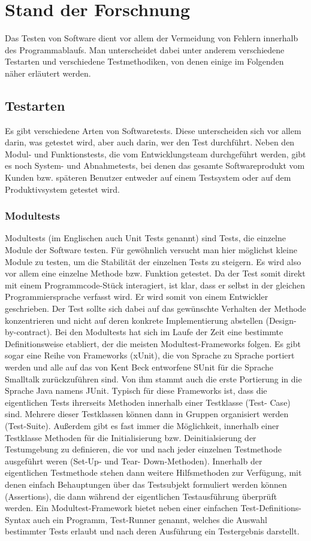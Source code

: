 \section{Stand der Forschnung}
Das Testen von Software dient vor allem der Vermeidung von Fehlern innerhalb des Programmablaufs. Man unterscheidet dabei unter anderem verschiedene Testarten und verschiedene Testmethodiken, von denen einige im Folgenden näher erläutert werden.

\subsection{Testarten}
Es gibt verschiedene Arten von Softwaretests. Diese unterscheiden sich vor allem darin, was getestet wird, aber auch darin, wer den Test durchführt. Neben den Modul- und Funktionstests, die vom Entwicklungsteam durchgeführt werden, gibt es noch System- und Abnahmetests, bei denen das gesamte Softwareprodukt vom Kunden bzw. späteren Benutzer entweder auf einem Testsystem oder auf dem Produktivsystem getestet wird.

\subsubsection{Modultests}
Modultests (im Englischen auch Unit Tests genannt) sind Tests, die einzelne Module der Software testen. Für gewöhnlich versucht man hier möglichst kleine Module zu testen, um die Stabilität der einzelnen Tests zu steigern. Es wird also vor allem eine einzelne Methode bzw. Funktion getestet. Da der Test somit direkt mit einem Programmcode-Stück interagiert, ist klar, dass er selbst in der gleichen Programmiersprache verfasst wird. Er wird somit von einem Entwickler geschrieben. Der Test sollte sich dabei auf das gewünschte Verhalten der Methode konzentrieren und nicht auf deren konkrete Implementierung abstellen (Design-by-contract). Bei den Modultests hat sich im Laufe der Zeit eine bestimmte Definitionsweise etabliert, der die meisten Modultest-Frameworks folgen. Es gibt sogar eine Reihe von Frameworks (xUnit), die von Sprache zu Sprache portiert werden und alle auf das von Kent Beck entworfene SUnit für die Sprache Smalltalk zurückzuführen sind. Von ihm stammt auch die erste Portierung in die Sprache Java namens JUnit. Typisch für diese Frameworks ist, dass die eigentlichen Tests ihrerseits Methoden innerhalb einer Testklasse (Test- Case) sind. Mehrere dieser Testklassen können dann in Gruppen organisiert werden (Test-Suite). Außerdem gibt es fast immer die Möglichkeit, innerhalb einer Testklasse Methoden für die Initialisierung bzw. Deinitialsierung der Testumgebung zu definieren, die vor und nach jeder einzelnen Testmethode ausgeführt weren (Set-Up- und Tear- Down-Methoden). Innerhalb der eigentlichen Testmethode stehen dann weitere Hilfsmethoden zur Verfügung, mit denen einfach Behauptungen über das Testsubjekt formuliert werden können (Assertions), die dann während der eigentlichen Testausführung überprüft werden. Ein Modultest-Framework bietet neben einer einfachen Test-Definitions-Syntax auch ein Programm, Test-Runner genannt, welches die Auswahl bestimmter Tests erlaubt und nach deren Ausführung ein Testergebnis darstellt.

